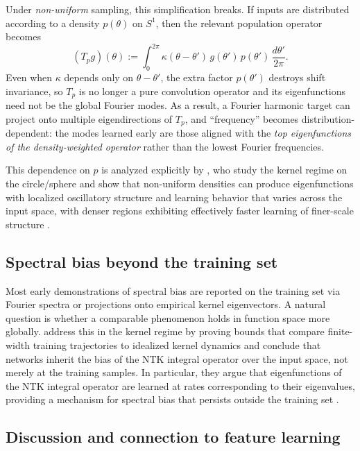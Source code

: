 Under \emph{non-uniform} sampling, this simplification breaks. If inputs are
distributed according to a density $p(\theta)$ on $S^1$, then the relevant
population operator becomes
\[
	(T_{p}g)(\theta)
	:=
	\int_0^{2\pi} \kappa(\theta-\theta')\,g(\theta')\,p(\theta')\,\frac{d\theta'}{2\pi}.
\]
Even when $\kappa$ depends only on $\theta-\theta'$, the extra factor
$p(\theta')$ destroys shift invariance, so $T_p$ is no longer a pure convolution
operator and its eigenfunctions need not be the global Fourier modes. As a
result, a Fourier harmonic target can project onto multiple eigendirections of
$T_p$, and ``frequency'' becomes distribution-dependent: the modes learned
early are those aligned with the \emph{top eigenfunctions of the density-weighted
	operator} rather than the lowest Fourier frequencies.

This dependence on $p$ is analyzed explicitly by \citet{basri2020frequencybiasneuralnetworks},
who study the kernel regime on the circle/sphere and show that non-uniform
densities can produce eigenfunctions with localized oscillatory structure and
learning behavior that varies across the input space, with denser regions
exhibiting effectively faster learning of finer-scale structure
\citep{basri2020frequencybiasneuralnetworks}.

\subsection{Spectral bias beyond the training set}

Most early demonstrations of spectral bias are reported on the training set via
Fourier spectra or projections onto empirical kernel eigenvectors. A natural
question is whether a comparable phenomenon holds in function space more
globally. \citet{bowman2022spectralbiasoutsidetraining} address this in the
kernel regime by proving bounds that compare finite-width training trajectories
to idealized kernel dynamics and conclude that networks inherit the bias of the
NTK integral operator over the input space, not merely at the training samples.
In particular, they argue that eigenfunctions of the NTK integral operator are
learned at rates corresponding to their eigenvalues, providing a mechanism for
spectral bias that persists outside the training set \citep{bowman2022spectralbiasoutsidetraining}.

\subsection{Discussion and connection to feature learning}

